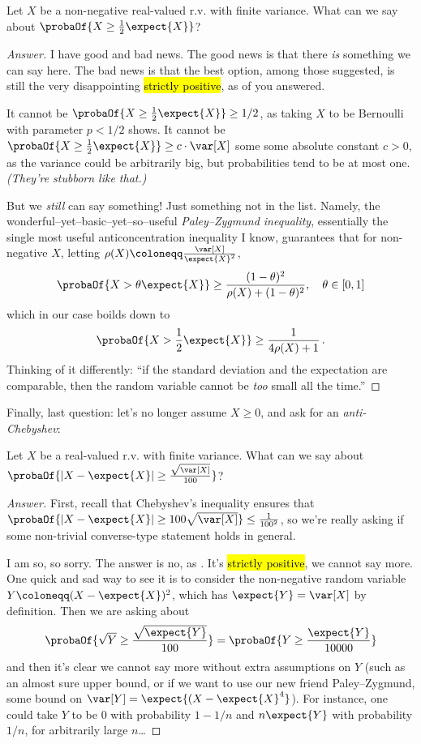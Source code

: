 \documentclass[10pt]{article}
\renewcommand{\eqdef}{\coloneqq}
\begin{document}
\begin{quest}
Let $X$ be a non-negative real-valued r.v. with finite variance. What can we say about $\probaOf{X \geq \frac{1}{2}\expect{X}}$?
\end{quest}
\begin{proof}[Answer]
I have good and bad news. The good news is that there \emph{is} something we can say here. The bad news is that the best option, among those suggested, is still the very disappointing \hl{strictly positive}, as  of you answered.

It cannot be $\probaOf{X \geq \frac{1}{2}\expect{X}}\geq 1/2$, as taking $X$ to be Bernoulli with parameter $p < 1/2$ shows. It cannot be $\probaOf{X \geq \frac{1}{2}\expect{X}}\geq c\cdot \var[X]$ some some absolute constant $c>0$, as the variance could be arbitrarily big, but probabilities tend to be at most one. \emph{(They're stubborn like that.)}

But we \emph{still} can say something! Just something not in the list. Namely, the wonderful--yet--basic--yet--so--useful \emph{Paley--Zygmund inequality}, essentially the single most useful anticoncentration inequality I know, guarantees that for non-negative $X$, letting $\rho(X)\eqdef \frac{\var[X]}{\expect{X}^2}$,
\[
    \probaOf{X > \theta\expect{X}} \geq \frac{(1-\theta)^2}{\rho(X)+(1-\theta)^2}, \quad \theta \in [0,1]
\]
which in our case boilds down to
\[
    \probaOf{X > \frac{1}{2}\expect{X}} \geq \frac{1}{4\rho(X)+1}\,.
\]
Thinking of it differently: ``if the standard deviation and the expectation are comparable, then the random variable cannot be \emph{too} small all the time.''
\end{proof}

\noindent Finally, last question: let's no longer assume $X\geq 0$, and ask for an \emph{anti-Chebyshev}:
\begin{quest}
Let $X$ be a real-valued r.v. with finite variance. What can we say about $\probaOf{|X-\expect{X}| \geq \frac{\sqrt{\var[X]}}{100}}$?
\end{quest}
\begin{proof}[Answer]
  First, recall that Chebyshev's inequality ensures that $\probaOf{|X-\expect{X}| \geq 100\sqrt{\var[X]}} \leq \frac{1}{100^2}$, so we're really asking if some non-trivial converse-type statement holds in general. 
  
  I am so, so sorry. The answer is no, as . It's \hl{strictly positive}, we cannot say more. One quick and sad way to see it is to consider the non-negative random variable $Y\eqdef (X-\expect{X})^2$, which has $\expect{Y} = \var[X]$ by definition. Then we are asking about 
  \[
    \probaOf{\sqrt{Y} \geq \frac{\sqrt{\expect{Y}}}{100}} = \probaOf{Y \geq \frac{\expect{Y}}{10000}}
  \]
  and then it's clear we cannot say more without extra assumptions on $Y$ (such as an almost sure upper bound, or if we want to use our new friend Paley--Zygmund, some bound on $\var[Y] = \expect{(X-\expect{X}^4}$). For instance, one could take $Y$ to be $0$ with probability $1-1/n$ and $n \expect{Y}$ with probability $1/n$, for arbitrarily large $n$\dots
\end{proof}
\end{document}
